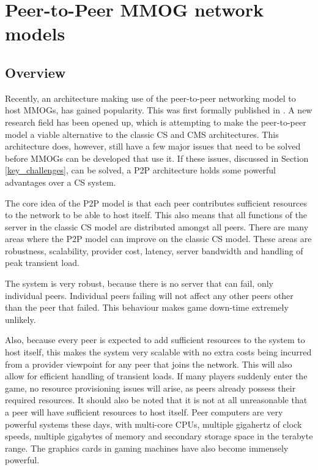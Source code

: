 \documentclass[journal,oneside,a4paper,onecolumn]{IEEEtran}
\begin{document}
\section{Peer-to-Peer MMOG network models}
\label{p2p_network_models}

\subsection{Overview}
\label{p2p_mmog_overview}

Recently, an architecture making use of the peer-to-peer networking model to host MMOGs, has gained popularity. This was first formally published in \cite{knutsson_p2p_first}. A new research field has been opened up, which is attempting to make the peer-to-peer model a viable alternative to the classic \ac{CS} and \ac{CMS} architectures. This architecture does, however, still have a few major issues that need to be solved before MMOGs can be developed that use it. If these issues, discussed in Section \ref{key_challenges}, can be solved, a \ac{P2P} architecture holds some powerful advantages over a \ac{CS} system.

The core idea of the \ac{P2P} model is that each peer contributes sufficient resources to the network to be able to host itself. This also means that all functions of the server in the classic \ac{CS} model are distributed amongst all peers. There are many areas where the \ac{P2P} model can improve on the classic \ac{CS} model. These areas are robustness, scalability, provider cost, latency, server bandwidth and handling of peak transient load.

The system is very robust, because there is no server that can fail, only individual peers. Individual peers failing will not affect any other peers other than the peer that failed. This behaviour makes game down-time extremely unlikely.

Also, because every peer is expected to add sufficient resources to the system to host itself, this makes the system very scalable with no extra costs being incurred from a provider viewpoint for any peer that joins the network. This will also allow for efficient handling of transient loads. If many players suddenly enter the game, no resource provisioning issues will arise, as peers already possess their required resources. It should also be noted that it is not at all unreasonable that a peer will have sufficient resources to host itself. Peer computers are very powerful systems these days, with multi-core CPUs, multiple gigahertz of clock speeds, multiple gigabytes of memory and secondary storage space in the terabyte range. The graphics cards in gaming machines have also become immensely powerful.
\end{document}

